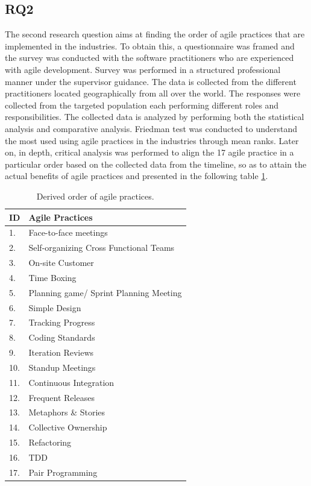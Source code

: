 \documentclass[a4paper,oneside]{bth}
\begin{document}
\subsection{RQ2}
The second research question aims at finding the order of agile practices that are implemented in the industries. To obtain this, a questionnaire was framed and the survey was conducted with the software practitioners who are experienced with agile development. Survey was performed in a structured professional manner under the supervisor guidance. The data is collected from the different practitioners located geographically from all over the world. The responses were collected from the targeted population each performing different roles and responsibilities. The collected data is analyzed by performing both the statistical analysis and comparative analysis. Friedman test was conducted to understand the most used using agile practices in the industries through mean ranks. Later on, in depth, critical analysis was performed to align the 17 agile practice in a particular order based on the collected data from the timeline, so as to attain the actual benefits of agile practices and presented in the following table \ref{derived}.
\begin{longtable}[h]{|l|l|}
\caption{Derived order of agile practices.\label{derived}}\\
\hline
\textbf{ID} & \textbf{Agile Practices}               \\ \hline
1.          & Face-to-face meetings                  \\ \hline
2.          & Self-organizing Cross Functional Teams \\ \hline
3.          & On-site Customer                       \\ \hline
4.          & Time Boxing                            \\ \hline
5.          & Planning game/ Sprint Planning Meeting \\ \hline
6.          & Simple Design                          \\ \hline
7.          & Tracking Progress                      \\ \hline
8.          & Coding Standards                       \\ \hline
9.          & Iteration Reviews                      \\ \hline
10.         & Standup Meetings                       \\ \hline
11.         & Continuous Integration                 \\ \hline
12.         & Frequent Releases                      \\ \hline
13.         & Metaphors \& Stories                   \\ \hline
14.         & Collective Ownership                   \\ \hline
15.         & Refactoring                            \\ \hline
16.         & TDD                                    \\ \hline
17.         & Pair Programming                       \\ \hline
\end{longtable}
\end{document}
